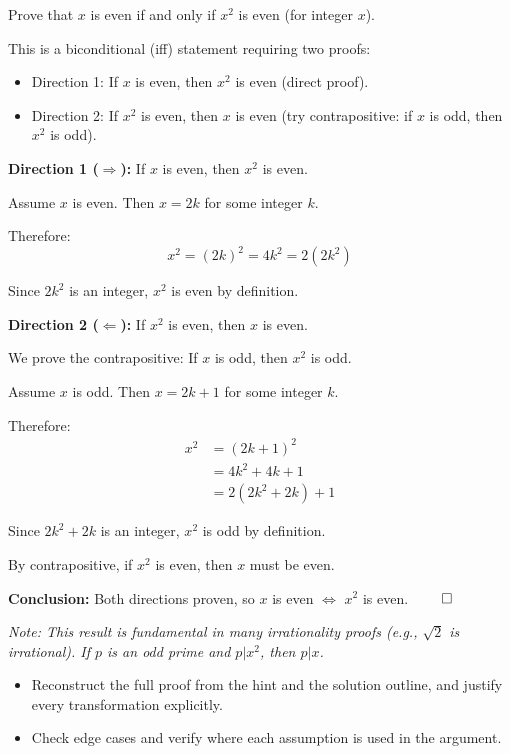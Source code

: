 
\begin{problem}
Prove that $x$ is even if and only if $x^2$ is even (for integer $x$).
\end{problem}

\begin{hint}
This is a biconditional (iff) statement requiring two proofs:
\begin{itemize}
\item Direction 1: If $x$ is even, then $x^2$ is even (direct proof).
\item Direction 2: If $x^2$ is even, then $x$ is even (try contrapositive: if $x$ is odd, then $x^2$ is odd).
\end{itemize}
\end{hint}

\begin{solution}
\textbf{Direction 1 ($\Rightarrow$):} If $x$ is even, then $x^2$ is even.

Assume $x$ is even. Then $x = 2k$ for some integer $k$.

Therefore:
\[
x^2 = (2k)^2 = 4k^2 = 2(2k^2)
\]

Since $2k^2$ is an integer, $x^2$ is even by definition.

\vspace{0.5cm}

\textbf{Direction 2 ($\Leftarrow$):} If $x^2$ is even, then $x$ is even.

We prove the contrapositive: If $x$ is odd, then $x^2$ is odd.

Assume $x$ is odd. Then $x = 2k + 1$ for some integer $k$.

Therefore:
\begin{align*}
x^2 &= (2k+1)^2 \\
&= 4k^2 + 4k + 1 \\
&= 2(2k^2 + 2k) + 1
\end{align*}

Since $2k^2 + 2k$ is an integer, $x^2$ is odd by definition.

By contrapositive, if $x^2$ is even, then $x$ must be even.

\vspace{0.5cm}

\textbf{Conclusion:} Both directions proven, so $x$ is even $\iff$ $x^2$ is even. $\qed$

\vspace{0.3cm}

\textit{Note: This result is fundamental in many irrationality proofs (e.g., $\sqrt{2}$ is irrational). If $p$ is an odd prime and $p|x^2$, then $p|x$.}
\end{solution}

\begin{takeaways}
\begin{itemize}[leftmargin=*]
\item Reconstruct the full proof from the hint and the solution outline, and justify every transformation explicitly.
\item Check edge cases and verify where each assumption is used in the argument.
\end{itemize}
\end{takeaways}
